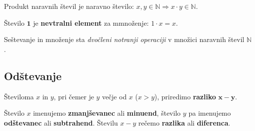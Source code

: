 \begin{figure}[H]
            
    \end{figure}

     
        Produkt naravnih števil je naravno število: $x, y \in \mathbb{N} \Rightarrow x\cdot y \in \mathbb{N}$.
        \newline

        Število $\mathbf{1}$ je \textbf{nevtralni element} za mmnoženje: $1\cdot x = x$.
     \newline

 
        Seštevanje in množenje sta \textit{dvočleni notranji operaciji} v množici naravnih števil $\mathbb{N}$.

 
    

     \subsection{Odštevanje}
        Številoma $x$ in $y$, pri čemer je $y$ večje od $x$ ($x>y$), priredimo \textbf{razliko} $\mathbf{x-y}$.                
        \newline

        Število $x$ imenujemo \textbf{zmanjševanec} ali \textbf{minuend}, število $y$  pa imenujemo \textbf{odštevanec} ali \textbf{subtrahend}. 
        Številu $x-y$ rečemo \textbf{razlika} ali \textbf{diferenca}. 

